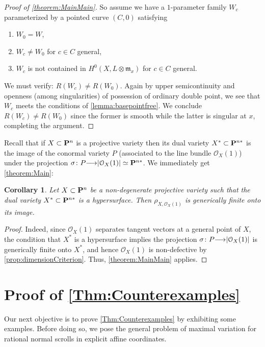 \documentclass[11pt,reqno]{amsart}
\theoremstyle{plain}
\newtheorem{corollary}[theorem]{Corollary}
\theoremstyle{definition}
\theoremstyle{remark}
\numberwithin{equation}{section}
\newcommand{\cO}{{\mathcal O}}
\renewcommand{\to}{{\longrightarrow}}
\numberwithin{equation}{section}
\begin{document}
\begin{proof}[Proof of \autoref{theorem:MainMain}]
So assume we have a $1$-parameter family $W_{c}$ parameterized by a pointed curve $(C,0)$ satisfying 
\begin{enumerate}
  \item $W_{0} = W$,
  \item $W_{c} \neq W_{0}$ for $c \in C$ general,
  \item $W_{c}$ is not contained in $H^{0}(X, L \otimes {\mathfrak m}_{x})$ for $c \in C$ general.
 \end{enumerate} 
 We must verify: $R(W_{c}) \neq R(W_{0})$.  Again by upper semicontinuity and openness (among singularities) of possession of ordinary double point, we see that $W_{c}$ meets the conditions of \autoref{lemma:basepointfree}. We conclude $R(W_{c}) \neq R(W_{0})$ since the former is smooth while the latter is singular at $x$, completing the argument.
\end{proof}

Recall that if $X \subset \P^{n}$ is a projective variety then its dual variety $X^{*} \subset \P^{n*}$ is the image of the conormal variety $P$ (associated to the line bundle $\cO_{X}(1)$) under the projection $\sigma\from P \to |\cO_{X}(1)| \simeq \P^{n*}$.   We immediately get \autoref{theorem:Main}:

\begin{corollary}
  \label{cor:maintheorem} Let $X \subset \P^{n}$ be a non-degenerate projective variety such that the dual variety $X^{*} \subset \P^{n*}$ is a hypersurface. Then $\rho_{X,\cO_{X}(1)}$ is generically finite onto its image.
\end{corollary}

\begin{proof}
    Indeed, since $\cO_{X}(1)$  separates tangent vectors at a general point of $X$, the condition that $X^{*}$ is a hypersurface implies the projection $\sigma\from P \to |\cO_{X}(1)|$ is generically finite onto $X^{*}$, and hence $\cO_{X}(1)$ is non-defective by \autoref{prop:dimensionCriterion}. Thus, \autoref{theorem:MainMain} applies.
  \end{proof}


\section{Proof of \autoref{Thm:Counterexamples}} %
\label{sec:proof_of_second_result}

Our next objective is to prove \autoref{Thm:Counterexamples} by exhibiting some
examples.  Before doing so, we pose the general problem of maximal variation for rational normal scrolls in explicit affine coordinates. 
\end{document}
